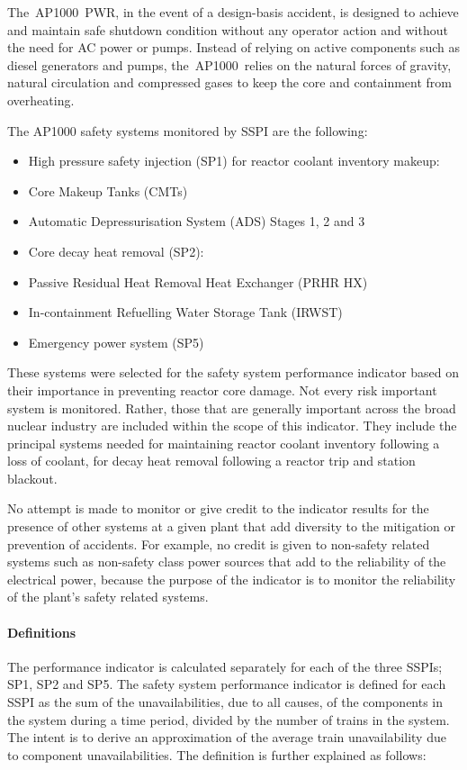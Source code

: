 The AP1000 PWR, in the event of a design-basis accident, is designed
to achieve and maintain safe shutdown condition without any operator
action and without the need for AC power or pumps. Instead of relying
on active components such as diesel generators and pumps,
the AP1000 relies on the natural forces of gravity, natural
circulation and compressed gases to keep the core and containment from
overheating.

The AP1000 safety systems monitored by SSPI are the following:
\begin{itemize}
\item High pressure safety injection (SP1) for reactor coolant inventory makeup:
\item Core Makeup Tanks (CMTs)
\item Automatic Depressurisation System (ADS) Stages 1, 2 and 3
\item Core decay heat removal (SP2):
\item Passive Residual Heat Removal Heat Exchanger (PRHR HX)
\item In-containment Refuelling Water Storage Tank (IRWST)
\item Emergency power system (SP5)
\end{itemize}

These systems were selected for the safety system performance
indicator based on their importance in preventing reactor core
damage. Not every risk important system is monitored. Rather, those
that are generally important across the broad nuclear industry are
included within the scope of this indicator. They include the
principal systems needed for maintaining reactor coolant inventory
following a loss of coolant, for decay heat removal following a
reactor trip and station blackout.

No attempt is made to monitor or give credit to the indicator results
for the presence of other systems at a given plant that add diversity
to the mitigation or prevention of accidents. For example, no credit
is given to non-safety related systems such as non-safety class power
sources that add to the reliability of the electrical power, because
the purpose of the indicator is to monitor the reliability of the
plant's safety related systems.

\paragraph{Definitions}

The performance indicator is calculated separately for each of the
three SSPIs; SP1, SP2 and SP5. The safety system performance indicator
is defined for each SSPI as the sum of the unavailabilities, due to
all causes, of the components in the system during a time period,
divided by the number of trains in the system. The intent is to derive
an approximation of the average train unavailability due to component
unavailabilities. The definition is further explained as follows:

